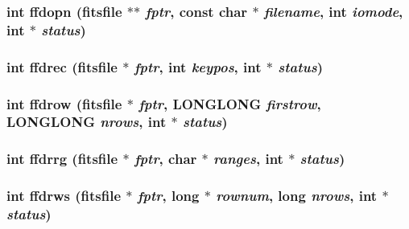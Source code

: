 \subsubsection{\setlength{\rightskip}{0pt plus 5cm}int ffdopn (\bf{fitsfile} $\ast$$\ast$ {\em fptr}, const char $\ast$ {\em filename}, int {\em iomode}, int $\ast$ {\em status})}\label{fitsio__64_8h_2bf742ed269ae35cef1f7ddfc146ccb3}


\subsubsection{\setlength{\rightskip}{0pt plus 5cm}int ffdrec (\bf{fitsfile} $\ast$ {\em fptr}, int {\em keypos}, int $\ast$ {\em status})}\label{fitsio__64_8h_a0470408dc45f3c4b0d813f8558b6afc}


\subsubsection{\setlength{\rightskip}{0pt plus 5cm}int ffdrow (\bf{fitsfile} $\ast$ {\em fptr}, \bf{LONGLONG} {\em firstrow}, \bf{LONGLONG} {\em nrows}, int $\ast$ {\em status})}\label{fitsio__64_8h_9012004200b2e01ba5202319cac22a3d}


\subsubsection{\setlength{\rightskip}{0pt plus 5cm}int ffdrrg (\bf{fitsfile} $\ast$ {\em fptr}, char $\ast$ {\em ranges}, int $\ast$ {\em status})}\label{fitsio__64_8h_193b5d6c2d1fd0dec8af3d08a1156120}


\subsubsection{\setlength{\rightskip}{0pt plus 5cm}int ffdrws (\bf{fitsfile} $\ast$ {\em fptr}, long $\ast$ {\em rownum}, long {\em nrows}, int $\ast$ {\em status})}\label{fitsio__64_8h_450ce3d96ff7a288a6a85572eb3ea833}


